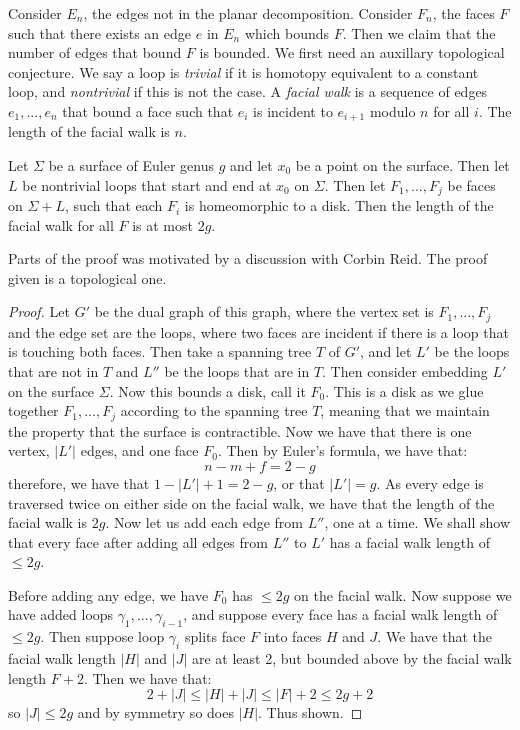 Consider $E_n$, the edges not in the planar decomposition. Consider $F_n$, the faces $F$ such that there exists an edge $e$ in $E_n$ which bounds $F$. Then we claim that the number of edges that bound $F$ is bounded. We first need an auxillary topological conjecture. We say a loop is \textit{trivial} if it is homotopy equivalent to a constant loop, and \textit{nontrivial} if this is not the case. A \textit{facial walk} is a sequence of edges $e_1, ..., e_n$ that bound a face such that $e_i$ is incident to $e_{i + 1}$ modulo $n$ for all $i$. The length of the facial walk is $n$. 

\begin{lemma}
	Let $\Sigma$ be a surface of Euler genus $g$ and let $x_0$ be a point on the surface. Then let $L$ be nontrivial loops that start and end at $x_0$ on $\Sigma$. Then let $F_1, ..., F_j$ be faces on $\Sigma + L$, such that each $F_i$ is homeomorphic to a disk. Then the length of the facial walk for all $F$ is at most $2g$. 
\end{lemma}

Parts of the proof was motivated by a discussion with Corbin Reid. The proof given is a topological one. 

\begin{proof}
	Let $G'$ be the dual graph of this graph, where the vertex set is $F_1, ..., F_j$ and the edge set are the loops, where two faces are incident if there is a loop that is touching both faces. Then take a spanning tree $T$ of $G'$, and let $L'$ be the loops that are not in $T$ and $L''$ be the loops that are in $T$. 
	Then consider embedding $L'$ on the surface $\Sigma$. Now this bounds a disk, call it $F_0$. This is a disk as we glue together $F_1, ..., F_j$ according to the spanning tree $T$, meaning that we maintain the property that the surface is contractible.
	Now we have that there is one vertex, $|L'|$ edges, and one face $F_0$. Then by Euler's formula, we have that:
	\begin{equation}
		n - m + f = 2 - g
	\end{equation}
	therefore, we have that $1 - |L'| + 1 = 2 - g$, or that $|L'| = g$. As every edge is traversed twice on either side on the facial walk, we have that the length of the facial walk is $2g$. 
	Now let us add each edge from $L''$, one at a time. We shall show that every face after adding all edges from $L''$ to $L'$ has a facial walk length of $\leq 2g$. 
	
	Before adding any edge, we have $F_0$ has $\leq 2g$ on the facial walk. Now suppose we have added loops $\gamma_1, ..., \gamma_{i - 1}$, and suppose every face has a facial walk length of $\leq 2g$. 
	Then suppose loop $\gamma_i$ splits face $F$ into faces $H$ and $J$. We have that the facial walk length $|H|$ and $|J|$ are at least 2, but bounded above by the facial walk length $F + 2$. Then we have that: 
	\begin{equation}
		2 + |J| \leq |H| + |J| \leq |F| + 2 \leq 2g + 2
	\end{equation}
	so $|J| \leq 2g$ and by symmetry so does $|H|$. Thus shown.
\end{proof}

